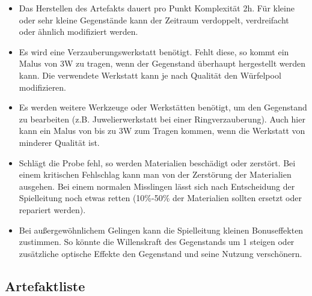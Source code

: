 \documentclass{article}
\begin{document}
\begin{itemize}
\item Das Herstellen des Artefakts dauert pro Punkt Komplexität 2h. Für kleine oder sehr kleine Gegenstände kann der Zeitraum verdoppelt, verdreifacht oder ähnlich modifiziert werden.
\item Es wird eine Verzauberungswerkstatt benötigt. Fehlt diese, so kommt ein Malus von 3W zu tragen, wenn der Gegenstand überhaupt hergestellt werden kann. Die verwendete Werkstatt kann je nach Qualität den Würfelpool modifizieren.
\item Es werden weitere Werkzeuge oder Werkstätten benötigt, um den Gegenstand zu bearbeiten (z.B. Juwelierwerkstatt bei einer Ringverzauberung). Auch hier kann ein Malus von bis zu 3W zum Tragen kommen, wenn die Werkstatt von minderer Qualität ist.
\item Schlägt die Probe fehl, so werden Materialien beschädigt oder zerstört. Bei einem kritischen Fehlschlag kann man von der Zerstörung der Materialien ausgehen. Bei einem normalen Misslingen lässt sich nach Entscheidung der Spielleitung noch etwas retten (10\%-50\% der Materialien sollten ersetzt oder repariert werden).
\item Bei außergewöhnlichem Gelingen kann die Spielleitung kleinen Bonuseffekten zustimmen. So könnte die Willenskraft des Gegenstands um 1 steigen oder zusätzliche optische Effekte den Gegenstand und seine Nutzung verschönern.
\end{itemize}

\newpage

\begin{center}
\subsection{Artefaktliste}
\end{center}
\end{document}
